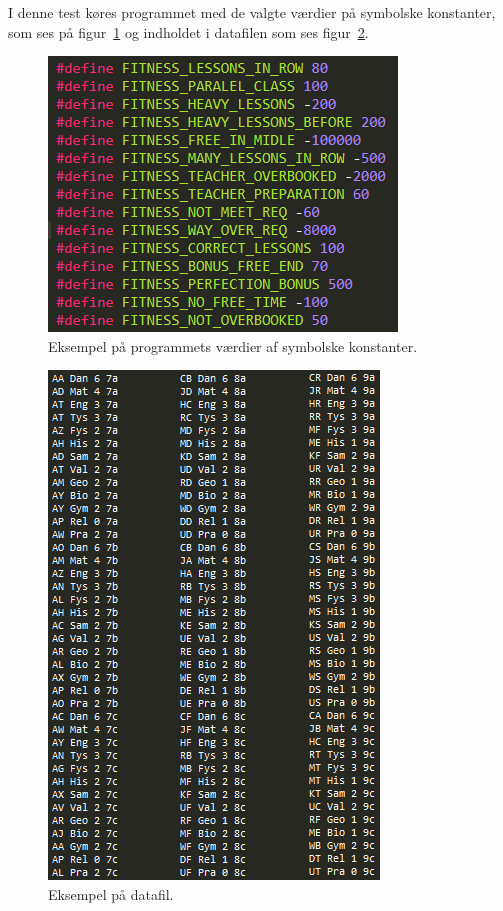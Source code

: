 I denne test køres programmet med de valgte værdier på symbolske konstanter, som ses på figur~\ref{fig:def} og indholdet i datafilen som ses figur~\ref{fig:info}.

\begin{figure}[!h]
  \includegraphics[scale = 1]{partials/graphics/programtestdef.png}
  \caption{Eksempel på programmets værdier af symbolske konstanter.}
  \label{fig:def}
\end{figure}

\begin{figure}[!h]
  \includegraphics[scale = 1]{partials/graphics/programtestinfo.png}
  \caption{Eksempel på datafil.}
  \label{fig:info}
\end{figure}

